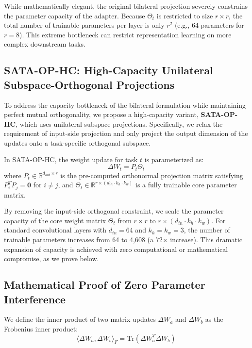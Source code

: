 \documentclass{article}
\theoremstyle{plain}
\theoremstyle{definition}
\theoremstyle{remark}
\begin{document}
While mathematically elegant, the original bilateral projection severely constrains the parameter capacity of the adapter. Because $\Theta_t$ is restricted to size $r \times r$, the total number of trainable parameters per layer is only $r^2$ (e.g., 64 parameters for $r=8$). This extreme bottleneck can restrict representation learning on more complex downstream tasks.

\subsection{SATA-OP-HC: High-Capacity Unilateral Subspace-Orthogonal Projections}
To address the capacity bottleneck of the bilateral formulation while maintaining perfect mutual orthogonality, we propose a high-capacity variant, \textbf{SATA-OP-HC}, which uses unilateral subspace projections. Specifically, we relax the requirement of input-side projection and only project the output dimension of the updates onto a task-specific orthogonal subspace.

In SATA-OP-HC, the weight update for task $t$ is parameterized as:
\begin{equation}
    \Delta W_t = P_t \Theta_t
\end{equation}
where $P_t \in \mathbb{R}^{d_{out} \times r}$ is the pre-computed orthonormal projection matrix satisfying $P_i^T P_j = \mathbf{0}$ for $i \neq j$, and $\Theta_t \in \mathbb{R}^{r \times (d_{in} \cdot k_h \cdot k_w)}$ is a fully trainable core parameter matrix. 

By removing the input-side orthogonal constraint, we scale the parameter capacity of the core weight matrix $\Theta_t$ from $r \times r$ to $r \times (d_{in} \cdot k_h \cdot k_w)$. For standard convolutional layers with $d_{in} = 64$ and $k_h=k_w=3$, the number of trainable parameters increases from 64 to 4,608 (a 72$\times$ increase). This dramatic expansion of capacity is achieved with zero computational or mathematical compromise, as we prove below.

\subsection{Mathematical Proof of Zero Parameter Interference}
We define the inner product of two matrix updates $\Delta W_a$ and $\Delta W_b$ as the Frobenius inner product:
\begin{equation}
    \langle \Delta W_a, \Delta W_b \rangle_F = \text{Tr}(\Delta W_a^T \Delta W_b)
\end{equation}
\end{document}
